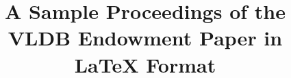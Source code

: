 \documentclass{vldb}
\begin{document}

\title{A Sample {\ttlit Proceedings of the VLDB Endowment} Paper in LaTeX
Format}




%
%
%
%

\end{document}
